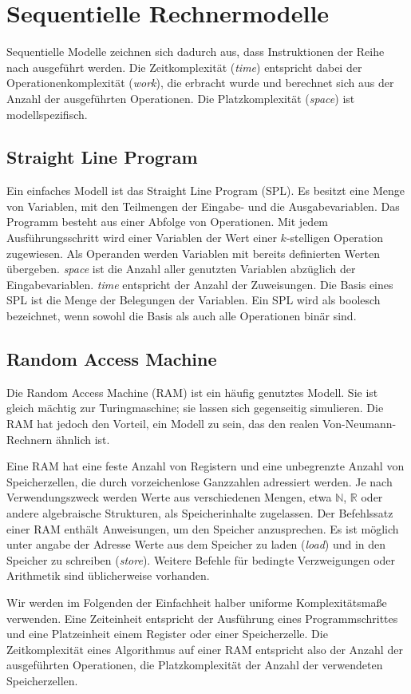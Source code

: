\section{Sequentielle Rechnermodelle}
Sequentielle Modelle zeichnen sich dadurch aus, dass Instruktionen der Reihe
nach ausgeführt werden.
Die Zeitkomplexität (\emph{time}) entspricht dabei der Operationenkomplexität
(\emph{work}), die erbracht wurde und berechnet sich aus der Anzahl der
ausgeführten Operationen.
Die Platzkomplexität (\emph{space}) ist modellspezifisch.


\subsection{Straight Line Program}
Ein einfaches Modell ist das Straight Line Program (SPL).
Es besitzt eine Menge von Variablen, mit den Teilmengen der Eingabe- und die
Ausgabevariablen.
Das Programm besteht aus einer Abfolge von Operationen.
Mit jedem Ausführungsschritt wird einer Variablen der Wert einer $k$-stelligen
Operation zugewiesen.
Als Operanden werden Variablen mit bereits definierten Werten übergeben.
\emph{space} ist die Anzahl aller genutzten Variablen abzüglich der
Eingabevariablen.
\emph{time} entspricht der Anzahl der Zuweisungen.
Die Basis eines SPL ist die Menge der Belegungen der Variablen.
Ein SPL wird als boolesch bezeichnet, wenn sowohl die Basis als auch alle
Operationen binär sind.
\cite[S. 9]{reif}


\subsection{Random Access Machine}
Die Random Access Machine (RAM) ist ein häufig genutztes Modell.
Sie ist gleich mächtig zur Turingmaschine; sie lassen sich gegenseitig
simulieren.
Die RAM hat jedoch den Vorteil, ein Modell zu sein, das den realen
Von-Neumann-Rechnern ähnlich ist.

Eine RAM hat eine feste Anzahl von Registern und eine unbegrenzte Anzahl von
Speicherzellen, die durch vorzeichenlose Ganzzahlen adressiert werden.
Je nach Verwendungszweck werden Werte aus verschiedenen Mengen, etwa
$\mathbb{N}$, $\mathbb{R}$ oder andere algebraische Strukturen, als
Speicherinhalte zugelassen.
Der Befehlssatz einer RAM enthält Anweisungen, um den Speicher anzusprechen.
Es ist möglich unter angabe der Adresse Werte aus dem Speicher zu laden
(\emph{load}) und in den Speicher zu schreiben (\emph{store}).
Weitere Befehle für bedingte Verzweigungen oder Arithmetik sind üblicherweise
vorhanden.

Wir werden im Folgenden der Einfachheit halber uniforme Komplexitätsmaße
verwenden.
Eine Zeiteinheit entspricht der Ausführung eines Programmschrittes
und eine Platzeinheit einem Register oder einer Speicherzelle.
Die Zeitkomplexität eines Algorithmus auf einer RAM entspricht also der Anzahl
der ausgeführten Operationen, die Platzkomplexität der Anzahl der verwendeten
Speicherzellen.
\cite[S. 9ff.]{reif}
\cite[S. 184ff.]{fgi2}

